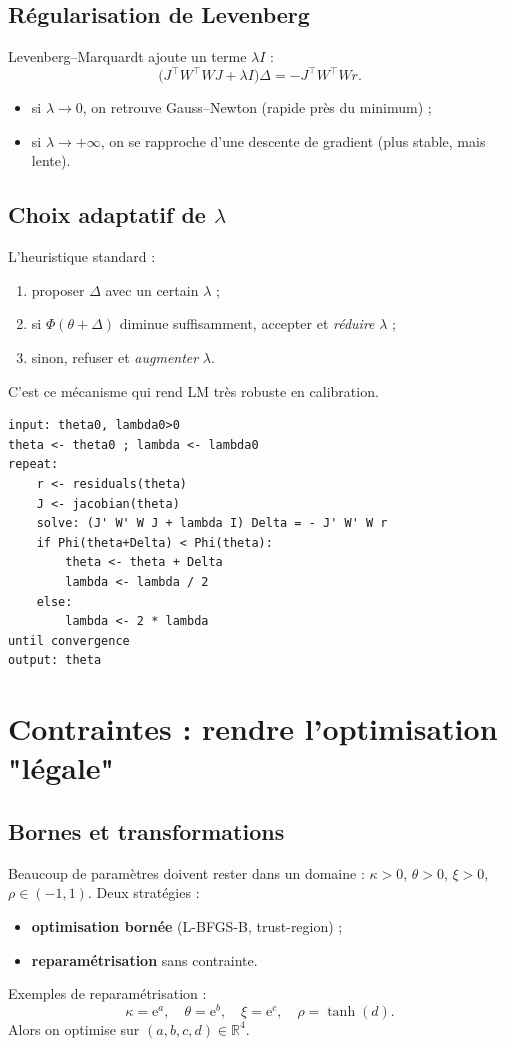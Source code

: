 \documentclass[11pt,a4paper]{report}
\newcommand{\ee}{\mathrm{e}}
\newcommand{\R}{\mathbb{R}}
\newcommand{\1}{\mathbbm{1}}
\theoremstyle{definition}
\theoremstyle{plain}
\theoremstyle{remark}
\begin{document}
\subsection{Régularisation de Levenberg}
Levenberg--Marquardt ajoute un terme $\lambda I$ :
\[
\bigl(J^\top W^\top WJ + \lambda I\bigr)\Delta = -J^\top W^\top Wr.
\]
\begin{itemize}
  \item si $\lambda\to 0$, on retrouve Gauss--Newton (rapide près du minimum) ;
  \item si $\lambda\to +\infty$, on se rapproche d'une descente de gradient (plus stable, mais lente).
\end{itemize}

\subsection{Choix adaptatif de $\lambda$}
L'heuristique standard :
\begin{enumerate}[label=\alph*)]
  \item proposer $\Delta$ avec un certain $\lambda$ ;
  \item si $\Phi(\theta+\Delta)$ diminue suffisamment, accepter et \emph{réduire} $\lambda$ ;
  \item sinon, refuser et \emph{augmenter} $\lambda$.
\end{enumerate}
C'est ce mécanisme qui rend LM très robuste en calibration.

\begin{lstlisting}[caption={Levenberg--Marquardt (schéma pédagogique)},label={lst:lm}]
input: theta0, lambda0>0
theta <- theta0 ; lambda <- lambda0
repeat:
    r <- residuals(theta)
    J <- jacobian(theta)
    solve: (J' W' W J + lambda I) Delta = - J' W' W r
    if Phi(theta+Delta) < Phi(theta):
        theta <- theta + Delta
        lambda <- lambda / 2
    else:
        lambda <- 2 * lambda
until convergence
output: theta
\end{lstlisting}

\section{Contraintes : rendre l'optimisation "légale"}

\subsection{Bornes et transformations}
Beaucoup de paramètres doivent rester dans un domaine : $\kappa>0$, $\theta>0$, $\xi>0$, $\rho\in(-1,1)$.
Deux stratégies :
\begin{itemize}
  \item \textbf{optimisation bornée} (L-BFGS-B, trust-region) ;
  \item \textbf{reparamétrisation} sans contrainte.
\end{itemize}
Exemples de reparamétrisation :
\[
\kappa = \ee^{a},\quad \theta=\ee^{b},\quad \xi=\ee^{c},\quad \rho=\tanh(d).
\]
Alors on optimise sur $(a,b,c,d)\in\R^4$.
\end{document}
